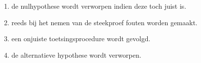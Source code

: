 \begin{enumerate}[label=(\alph*)]
    \item de nulhypothese wordt verworpen indien deze toch juist is.
    \item reeds bij het nemen van de steekproef fouten worden gemaakt.
    \item een onjuiste toetsingsprocedure wordt gevolgd.
    \item de alternatieve hypothese wordt verworpen.
\end{enumerate}
